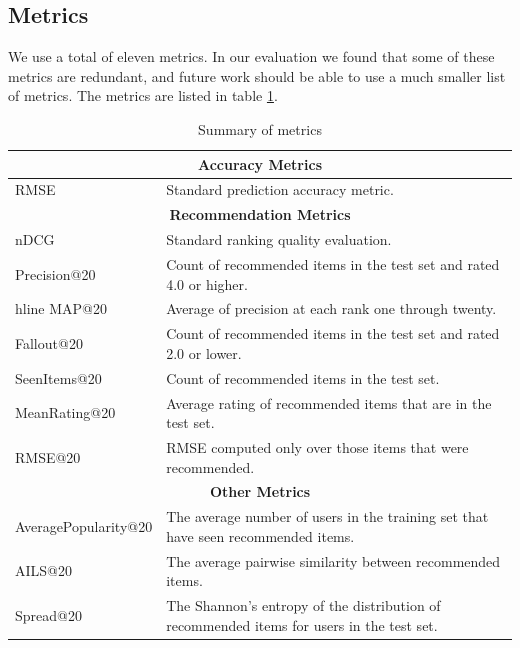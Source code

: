 \documentclass[letterpaper]{sig-alternate}
\begin{document}
  \subsection*{Metrics}
  We use a total of eleven metrics.
  In our evaluation we found that some of these metrics are redundant, and future work should be able to use a much smaller list of metrics.
  The metrics are listed in table \ref{tbl:metrics}.
  \begin{table}[ht!]
    \centering
    \begin{tabular}{|p{7em}|p{16em}|}
      \hline
      \multicolumn{2}{|c|}{{\bf Accuracy Metrics}} \\\hline
      RMSE                   & Standard prediction accuracy metric. \\\hline
      \hline
      \multicolumn{2}{|c|}{{\bf Recommendation Metrics}} \\\hline
      nDCG                   & Standard ranking quality evaluation.\\\hline
      Precision@20           & Count of recommended items in the test set and rated 4.0 or higher\footnotemark[1].\\hline
      MAP@20                 & Average of precision at each rank one through twenty.\\\hline
      Fallout@20             & Count of recommended items in the test set and rated 2.0 or lower\footnotemark[1].\\\hline
      SeenItems@20           & Count of recommended items in the test set.\\\hline
      MeanRating@20          & Average rating of recommended items that are in the test set.\\\hline
      RMSE@20                & RMSE computed only over those items that were recommended.\\\hline
      \hline
      \multicolumn{2}{|c|}{{\bf Other Metrics}} \\\hline
      Average\-Popularity@20 & The average number of users in the training set that have seen recommended items.\\\hline
      AILS@20                & The average pairwise similarity between recommended items. \\\hline
      Spread@20              & The Shannon's entropy of the distribution of recommended items for users in the test set.\\\hline
    \end{tabular}
    \caption{Summary of metrics}
    \label{tbl:metrics}
  \end{table}
  
\end{document}
